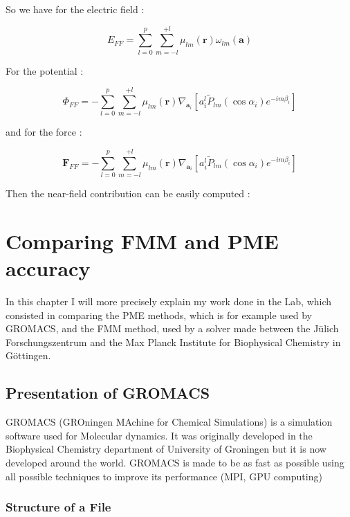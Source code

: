 \documentclass[11pt,twoside,a4paper]{report}
\begin{document}
   
   So we have for the electric field :
      
   \begin{equation}
   E_{FF} = \sum\limits_{l=0}^{p} \sum\limits_{m=-l}^{+l} \mu_{lm}(\textbf{r}) \omega_{lm}(\textbf{a})
   \end{equation}
   
   For the potential :
 
 	\begin{equation}
   \Phi_{FF} = - \sum\limits_{l=0}^{p} \sum\limits_{m=-l}^{+l} \mu_{lm}(\textbf{r}) \nabla_{\textbf{a}_i}[a_i^l \widetilde{P}_{lm}(\cos\alpha_i)e^{-im\beta_i}]
   \end{equation}
   
   and for the force :
   
   \begin{equation}
   \textbf{F}_{FF} = - \sum\limits_{l=0}^{p} \sum\limits_{m=-l}^{+l} \mu_{lm}(\textbf{r}) \nabla_{\textbf{a}_i}[a_i^l \widetilde{P}_{lm}(\cos\alpha_i)e^{-im\beta_i}]
   \end{equation}
   
 Then the near-field contribution can be easily computed : 

 

\chapter{Comparing FMM and PME accuracy}

    In this chapter I will more precisely explain my work done in the Lab, which consisted in comparing the PME methods, which is for example used by GROMACS, and the FMM method, used by a solver made between the Jülich Forschungszentrum and the Max Planck Institute for Biophysical Chemistry in Göttingen.

  


\section{Presentation of GROMACS}

    GROMACS (GROningen MAchine for Chemical Simulations) is a simulation software used for Molecular dynamics. It was originally developed in the Biophysical Chemistry department of University of Groningen but it is now developed around the world. GROMACS is made to be as fast as possible using all possible techniques to improve its performance (MPI, GPU computing) 
    
   
	\subsection{Structure of a File}
	
\end{document}
